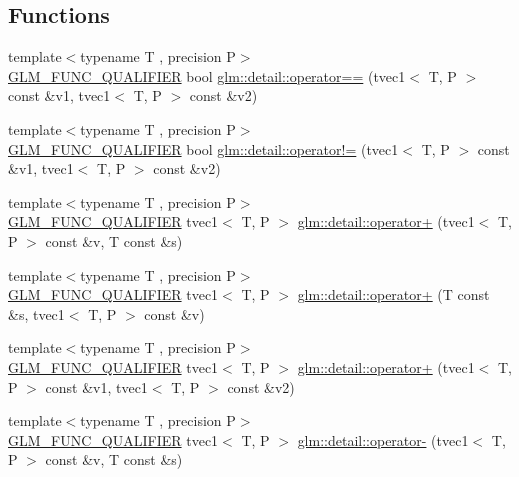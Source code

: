 \subsection*{Functions}
\begin{DoxyCompactItemize}
\item 
{\footnotesize template$<$typename T , precision P$>$ }\\\hyperlink{setup_8hpp_a33fdea6f91c5f834105f7415e2a64407}{G\+L\+M\+\_\+\+F\+U\+N\+C\+\_\+\+Q\+U\+A\+L\+I\+F\+I\+ER} bool \hyperlink{namespaceglm_1_1detail_a6e610117bce41d99cfd1c18ca4a53d72}{glm\+::detail\+::operator==} (tvec1$<$ T, P $>$ const \&v1, tvec1$<$ T, P $>$ const \&v2)
\item 
{\footnotesize template$<$typename T , precision P$>$ }\\\hyperlink{setup_8hpp_a33fdea6f91c5f834105f7415e2a64407}{G\+L\+M\+\_\+\+F\+U\+N\+C\+\_\+\+Q\+U\+A\+L\+I\+F\+I\+ER} bool \hyperlink{namespaceglm_1_1detail_a6e30c8adb0310f70625b5d4fd80b0cef}{glm\+::detail\+::operator!=} (tvec1$<$ T, P $>$ const \&v1, tvec1$<$ T, P $>$ const \&v2)
\item 
{\footnotesize template$<$typename T , precision P$>$ }\\\hyperlink{setup_8hpp_a33fdea6f91c5f834105f7415e2a64407}{G\+L\+M\+\_\+\+F\+U\+N\+C\+\_\+\+Q\+U\+A\+L\+I\+F\+I\+ER} tvec1$<$ T, P $>$ \hyperlink{namespaceglm_1_1detail_a45fdbcac9b1125b2dff4919934608324}{glm\+::detail\+::operator+} (tvec1$<$ T, P $>$ const \&v, T const \&s)
\item 
{\footnotesize template$<$typename T , precision P$>$ }\\\hyperlink{setup_8hpp_a33fdea6f91c5f834105f7415e2a64407}{G\+L\+M\+\_\+\+F\+U\+N\+C\+\_\+\+Q\+U\+A\+L\+I\+F\+I\+ER} tvec1$<$ T, P $>$ \hyperlink{namespaceglm_1_1detail_a87b4b92d60cad1435ea96d83d2f3f81f}{glm\+::detail\+::operator+} (T const \&s, tvec1$<$ T, P $>$ const \&v)
\item 
{\footnotesize template$<$typename T , precision P$>$ }\\\hyperlink{setup_8hpp_a33fdea6f91c5f834105f7415e2a64407}{G\+L\+M\+\_\+\+F\+U\+N\+C\+\_\+\+Q\+U\+A\+L\+I\+F\+I\+ER} tvec1$<$ T, P $>$ \hyperlink{namespaceglm_1_1detail_a79a2d907f9bbb9e527e2a600d480ffb9}{glm\+::detail\+::operator+} (tvec1$<$ T, P $>$ const \&v1, tvec1$<$ T, P $>$ const \&v2)
\item 
{\footnotesize template$<$typename T , precision P$>$ }\\\hyperlink{setup_8hpp_a33fdea6f91c5f834105f7415e2a64407}{G\+L\+M\+\_\+\+F\+U\+N\+C\+\_\+\+Q\+U\+A\+L\+I\+F\+I\+ER} tvec1$<$ T, P $>$ \hyperlink{namespaceglm_1_1detail_adfd6b0d7b4db9a0bfafff1d099cde992}{glm\+::detail\+::operator-\/} (tvec1$<$ T, P $>$ const \&v, T const \&s)

\end{DoxyCompactItemize}
